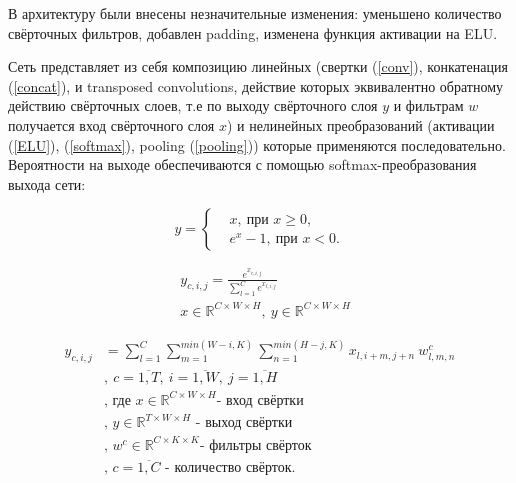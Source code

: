\documentclass[14pt, a4paper, oneside, bold]{extarticle}
\begin{document}
В архитектуру были внесены незначительные изменения: уменьшено количество свёрточных фильтров, добавлен padding, изменена функция активации на ELU.

Сеть представляет из себя композицию линейных
(свертки (\ref{conv}), конкатенация (\ref{concat}), и transposed convolutions, действие которых эквивалентно обратному действию свёрточных слоев, т.е по выходу свёрточного слоя $y$ и фильтрам $w$ получается вход свёрточного слоя $x$) 
и нелинейных преобразований
(активации (\ref{ELU}), (\ref{softmax}), pooling (\ref{pooling})) которые применяются последовательно. 
Вероятности на выходе обеспечиваются с помощью 
softmax-преобразования выхода сети: 

\begin{equation} \label{ELU}
	y = \begin{cases} 
		& x ,\ \text{при $x \geq 0$}, \\	
		& e^x - 1 ,\ \text{при $x < 0$}.
	\end{cases}
\end{equation}

\begin{equation} \label{softmax}
\begin{aligned}
	& y_{c, i, j} = \frac{ e^{x_{c, i, j}} }
		{ \sum \limits_{l=1}^{C} e^{x_{l, i, j}} } \\
	& x \in \mathbb{R}^{C \times W \times H}
		,\ y \in \mathbb{R}^{C \times W \times H}
\end{aligned}
\end{equation}

\begin{equation} \label{conv}
\begin{aligned}
	y_{c, i, j} & = \sum \limits_{l=1}^{C} 
		\sum \limits_{m=1}^{min(W - i, K)}
		\sum \limits_{n=1}^{min(H - j, K)} 
		x_{l, i + m, j + n} \ w^c_{l, m, n} \\
	& ,\ c = \overline{1, T} 
		,\ i = \overline{1, W}
		,\ j = \overline{1, H} \\
	& \text{, где $x \in \mathbb{R}^{C \times W \times H}$
		- вход свёртки} \\
	& \text{, $y \in \mathbb{R}^{T \times W \times H}$ 
		- выход свёртки} \\
	& \text{, $w^c \in \mathbb{R}^{C \times K \times K}$
		- фильтры свёрток} \\
	& \text{, $c=\overline{1, C}$ - количество свёрток}.
\end{aligned}
\end{equation}
\end{document}
